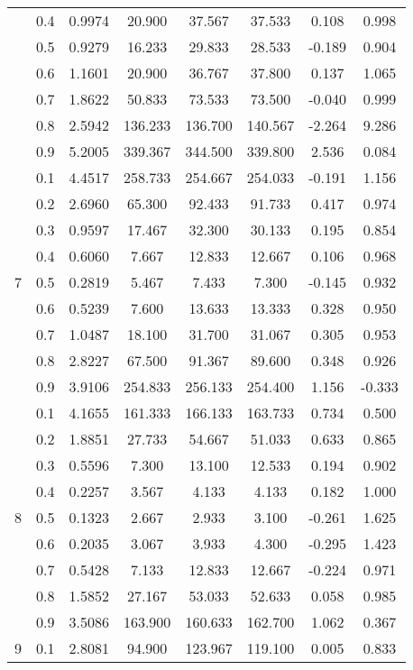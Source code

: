 \documentclass[11pt,a4paper]{report}
\begin{document}
\begin{longtable}{ | c | c || c | c | c | c | c | c | }
 & 0.4 & 0.9974 & 20.900 & 37.567 & 37.533 & 0.108 & 0.998 \\
 & 0.5 & 0.9279 & 16.233 & 29.833 & 28.533 & -0.189 & 0.904 \\
 & 0.6 & 1.1601 & 20.900 & 36.767 & 37.800 & 0.137 & 1.065 \\
 & 0.7 & 1.8622 & 50.833 & 73.533 & 73.500 & -0.040 & 0.999 \\
 & 0.8 & 2.5942 & 136.233 & 136.700 & 140.567 & -2.264 & 9.286 \\
 & 0.9 & 5.2005 & 339.367 & 344.500 & 339.800 & 2.536 & 0.084 \\
 \hline
\multirow{9}{*}{7} & 0.1 & 4.4517 & 258.733 & 254.667 & 254.033 & -0.191 & 1.156 \\
 & 0.2 & 2.6960 & 65.300 & 92.433 & 91.733 & 0.417 & 0.974 \\
 & 0.3 & 0.9597 & 17.467 & 32.300 & 30.133 & 0.195 & 0.854 \\
 & 0.4 & 0.6060 & 7.667 & 12.833 & 12.667 & 0.106 & 0.968 \\
 & 0.5 & 0.2819 & 5.467 & 7.433 & 7.300 & -0.145 & 0.932 \\
 & 0.6 & 0.5239 & 7.600 & 13.633 & 13.333 & 0.328 & 0.950 \\
 & 0.7 & 1.0487 & 18.100 & 31.700 & 31.067 & 0.305 & 0.953 \\
 & 0.8 & 2.8227 & 67.500 & 91.367 & 89.600 & 0.348 & 0.926 \\
 & 0.9 & 3.9106 & 254.833 & 256.133 & 254.400 & 1.156 & -0.333 \\
 \hline
\multirow{9}{*}{8} & 0.1 & 4.1655 & 161.333 & 166.133 & 163.733 & 0.734 & 0.500 \\
 & 0.2 & 1.8851 & 27.733 & 54.667 & 51.033 & 0.633 & 0.865 \\
 & 0.3 & 0.5596 & 7.300 & 13.100 & 12.533 & 0.194 & 0.902 \\
 & 0.4 & 0.2257 & 3.567 & 4.133 & 4.133 & 0.182 & 1.000 \\
 & 0.5 & 0.1323 & 2.667 & 2.933 & 3.100 & -0.261 & 1.625 \\
 & 0.6 & 0.2035 & 3.067 & 3.933 & 4.300 & -0.295 & 1.423 \\
 & 0.7 & 0.5428 & 7.133 & 12.833 & 12.667 & -0.224 & 0.971 \\
 & 0.8 & 1.5852 & 27.167 & 53.033 & 52.633 & 0.058 & 0.985 \\
 & 0.9 & 3.5086 & 163.900 & 160.633 & 162.700 & 1.062 & 0.367 \\
 \hline
\multirow{9}{*}{9} & 0.1 & 2.8081 & 94.900 & 123.967 & 119.100 & 0.005 & 0.833 \\

\end{longtable}
\end{document}
